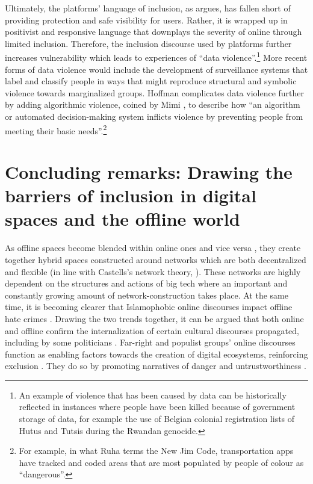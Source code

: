 \documentclass[output=paper,colorlinks,citecolor=brown]{langscibook}
\begin{document}
Ultimately, the platforms' language of inclusion, as \citet{hoffmann2021} argues, has fallen short of providing protection and safe visibility for users. Rather, it is wrapped up in positivist and responsive language that downplays the severity of online  through limited inclusion. Therefore, the inclusion discourse used by platforms further increases vulnerability which leads to experiences of ``data violence''.\footnote{%
An example of violence that has been caused by data can be historically reflected in instances where people have been killed because of government storage of data, for example the use of Belgian colonial registration lists of Hutus and Tutsis during the Rwandan genocide.} 
More recent forms of data violence would include the development of surveillance systems that label and classify people in ways that might reproduce structural and symbolic violence towards marginalized groups. Hoffman complicates data violence further by adding algorithmic violence, coined by Mimi \citet{onuoha2018}, to describe how ``an algorithm or automated decision-making system inflicts violence by preventing people from meeting their basic needs''.\footnote{%
For example, in what Ruha \citet{benjamin2019} terms the New Jim Code, transportation apps have tracked and coded areas that are most populated by people of colour as ``dangerous''.}

\section{Concluding remarks: Drawing the barriers of inclusion in digital spaces and the offline world}\label{ch.1.2.ss.5}

As offline spaces become blended within online ones and vice versa \citep{siuda2021}, they create together hybrid spaces constructed around networks which are both decentralized and flexible (in line with Castells's network theory, \citealt{castells2000}). These networks are highly dependent on the structures and actions of big tech where an important and constantly growing amount of network-construction takes place. At the same time, it is becoming clearer that Islamophobic online discourses impact offline hate crimes \citep{levin2016,muller_schwarz2020}. Drawing the two trends together, it can be argued that both online and offline  confirm the internalization of certain cultural discourses propagated, including by some politicians \citep{burnett2017}. Far-right and populist groups' online discourses function as enabling factors towards the creation of digital ecosystems, reinforcing exclusion \citep{perry_scrivens2018}. They do so by promoting narratives of danger and untrustworthiness \citep{uk_home_office2020}. 
\end{document}
